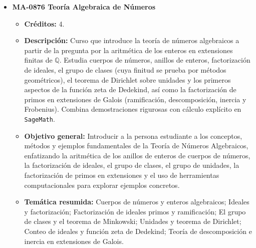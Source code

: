 \begin{itemize}[leftmargin=1.3em, itemsep=10pt, topsep=4pt, label={\color{Azul-UCR}$\blacksquare$}]
\item {\color{Azul-UCR}\textbf{MA-0876 Teoría Algebraica de Números}}\par\nopagebreak\smallskip
\begin{itemize}[leftmargin=1.1em, itemsep=3pt, topsep=2pt, parsep=2pt, label={\textendash}]
\item \textbf{Créditos:} 4.
\item \textbf{Descripción:} Curso que introduce la teoría de números algebraicos a partir de la pregunta por la aritmética de los enteros en extensiones finitas de $\mathbb{Q}$. Estudia cuerpos de números, anillos de enteros, factorización de ideales, el grupo de clases (cuya finitud se prueba por métodos geométricos), el teorema de Dirichlet sobre unidades y los primeros aspectos de la función zeta de Dedekind, así como la factorización de primos en extensiones de Galois (ramificación, descomposición, inercia y Frobenius). Combina demostraciones rigurosas con cálculo explícito en \texttt{SageMath}.
\item \textbf{Objetivo general:} Introducir a la persona estudiante a los conceptos, métodos y ejemplos fundamentales de la Teoría de Números Algebraicos, enfatizando la aritmética de los anillos de enteros de cuerpos de números, la factorización de ideales, el grupo de clases, el grupo de unidades, la factorización de primos en extensiones y el uso de herramientas computacionales para explorar ejemplos concretos.
\item \textbf{Temática resumida:} Cuerpos de números y enteros algebraicos; Ideales y factorización; Factorización de ideales primos y ramificación; El grupo de clases y el teorema de Minkowski; Unidades y teorema de Dirichlet; Conteo de ideales y función zeta de Dedekind; Teoría de descomposición e inercia en extensiones de Galois.
\end{itemize}


\end{itemize}
